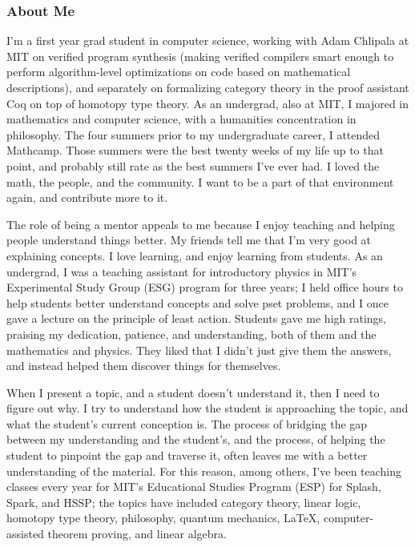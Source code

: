 \documentclass{article}
\begin{document}
\subsubsection*{About Me}
{\setlength{\parindent}{0pt}
\setlength{\parskip}{\baselineskip}

I'm a first year grad student in computer science, working with Adam Chlipala at MIT on verified program synthesis (making verified compilers smart enough to perform algorithm-level optimizations on code based on mathematical descriptions), and separately on formalizing category theory in the proof assistant Coq on top of homotopy type theory.  As an undergrad, also at MIT, I majored in mathematics and computer science, with a humanities concentration in philosophy.  The four summers prior to my undergraduate career, I attended Mathcamp.  Those summers were the best twenty weeks of my life up to that point, and probably still rate as the best summers I've ever had.  I loved the math, the people, and the community.  I want to be a part of that environment again, and contribute more to it.

The role of being a mentor appeals to me because I enjoy teaching and helping people understand things better.  My friends tell me that I'm very good at explaining concepts.  I love learning, and enjoy learning from students.  As an undergrad, I was a teaching assistant for introductory physics in MIT's Experimental Study Group (ESG) program for three years; I held office hours to help students better understand concepts and solve pset problems, and I once gave a lecture on the principle of least action.  Students gave me high ratings, praising my dedication, patience, and understanding, both of them and the mathematics and physics.  They liked that I didn't just give them the answers, and instead helped them discover things for themselves.

When I present a topic, and a student doesn't understand it, then I need to figure out why.  I try to understand how the student is approaching the topic, and what the student's current conception is.  The process of bridging the gap between my understanding and the student's, and the process, of helping the student to pinpoint the gap and traverse it, often leaves me with a better understanding of the material.  For this reason, among others, I've been teaching classes every year for MIT's Educational Studies Program (ESP) for Splash, Spark, and HSSP; the topics have included category theory, linear logic, homotopy type theory, philosophy, quantum mechanics, \LaTeX, computer-assisted theorem proving, and linear algebra.

}
\end{document}
